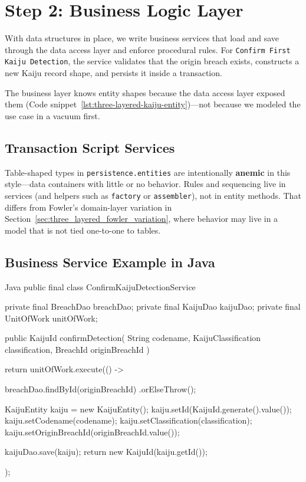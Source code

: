 \section{Step 2: Business Logic Layer}
\label{sec:three_layered_step2}

With data structures in place, we write business services that load and save through the data access layer and enforce procedural rules. For \texttt{Confirm First Kaiju Detection}, the service validates that the origin breach exists, constructs a new Kaiju record shape, and persists it inside a transaction.

The business layer knows entity shapes because the data access layer exposed them (Code snippet~\ref{lst:three-layered-kaiju-entity})---not because we modeled the use case in a vacuum first.

\subsection{Transaction Script Services}
\label{sec:three_layered_transaction_script}

Table-shaped types in \texttt{persistence.entities} are intentionally \textbf{anemic} in this style---data containers with little or no behavior. Rules and sequencing live in services (and helpers such as \texttt{factory} or \texttt{assembler}), not in entity methods. That differs from Fowler's domain-layer variation in Section~\ref{sec:three_layered_fowler_variation}, where behavior may live in a model that is not tied one-to-one to tables.

\subsection{Business Service Example in Java}
\label{sec:three_layered_application_service_java}

\begin{ridercode}{Java}
public final class ConfirmKaijuDetectionService
{
    private final BreachDao breachDao;
    private final KaijuDao kaijuDao;
    private final UnitOfWork unitOfWork;

    public KaijuId confirmDetection(
        String codename,
        KaijuClassification classification,
        BreachId originBreachId
    )
    {
        return unitOfWork.execute(() ->
        {
            breachDao.findById(originBreachId)
                .orElseThrow();

            KaijuEntity kaiju = new KaijuEntity();
            kaiju.setId(KaijuId.generate().value());
            kaiju.setCodename(codename);
            kaiju.setClassification(classification);
            kaiju.setOriginBreachId(originBreachId.value());

            kaijuDao.save(kaiju);
            return new KaijuId(kaiju.getId());
        });
    }
}
\end{ridercode}
\label{lst:three-layered-confirm-detection-service}

